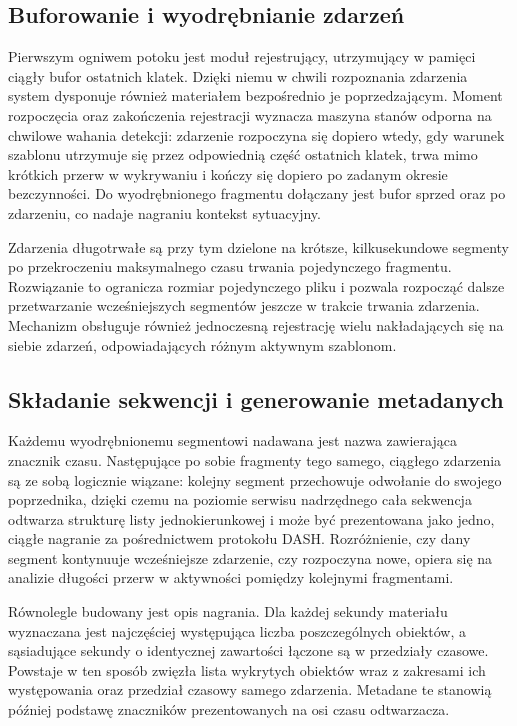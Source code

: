 \subsection{Buforowanie i wyodrębnianie zdarzeń}
Pierwszym ogniwem potoku jest moduł rejestrujący, utrzymujący w pamięci ciągły bufor ostatnich klatek. Dzięki niemu w chwili rozpoznania zdarzenia system dysponuje również materiałem bezpośrednio je poprzedzającym. Moment rozpoczęcia oraz zakończenia rejestracji wyznacza maszyna stanów odporna na chwilowe wahania detekcji: zdarzenie rozpoczyna się dopiero wtedy, gdy warunek szablonu utrzymuje się przez odpowiednią część ostatnich klatek, trwa mimo krótkich przerw w wykrywaniu i kończy się dopiero po zadanym okresie bezczynności. Do wyodrębnionego fragmentu dołączany jest bufor sprzed oraz po zdarzeniu, co nadaje nagraniu kontekst sytuacyjny.

Zdarzenia długotrwałe są przy tym dzielone na krótsze, kilkusekundowe segmenty po przekroczeniu maksymalnego czasu trwania pojedynczego fragmentu. Rozwiązanie to ogranicza rozmiar pojedynczego pliku i pozwala rozpocząć dalsze przetwarzanie wcześniejszych segmentów jeszcze w trakcie trwania zdarzenia. Mechanizm obsługuje również jednoczesną rejestrację wielu nakładających się na siebie zdarzeń, odpowiadających różnym aktywnym szablonom.

\subsection{Składanie sekwencji i generowanie metadanych}
Każdemu wyodrębnionemu segmentowi nadawana jest nazwa zawierająca znacznik czasu. Następujące po sobie fragmenty tego samego, ciągłego zdarzenia są ze sobą logicznie wiązane: kolejny segment przechowuje odwołanie do swojego poprzednika, dzięki czemu na poziomie serwisu nadrzędnego cała sekwencja odtwarza strukturę listy jednokierunkowej i może być prezentowana jako jedno, ciągłe nagranie za pośrednictwem protokołu DASH. Rozróżnienie, czy dany segment kontynuuje wcześniejsze zdarzenie, czy rozpoczyna nowe, opiera się na analizie długości przerw w aktywności pomiędzy kolejnymi fragmentami.

Równolegle budowany jest opis nagrania. Dla każdej sekundy materiału wyznaczana jest najczęściej występująca liczba poszczególnych obiektów, a sąsiadujące sekundy o identycznej zawartości łączone są w przedziały czasowe. Powstaje w ten sposób zwięzła lista wykrytych obiektów wraz z zakresami ich występowania oraz przedział czasowy samego zdarzenia. Metadane te stanowią później podstawę znaczników prezentowanych na osi czasu odtwarzacza.

